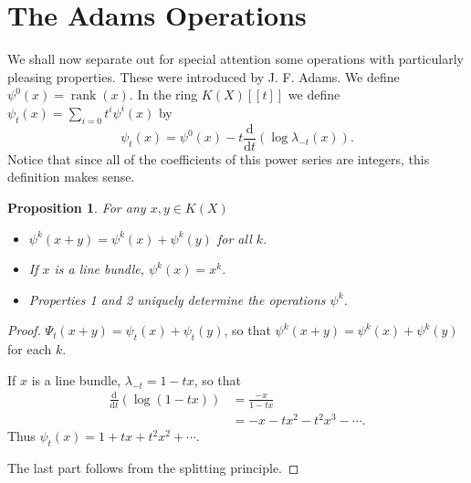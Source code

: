 \documentclass[leqno]{book}
\numberwithin{equation}{section}
\newtheorem{proposition}[theorem]{Proposition}
\theoremstyle{definition}
\begin{document}
        \section{The Adams Operations}
            We shall now separate out for special attention some operations with particularly pleasing properties. These were introduced by J. F. Adams. We define $\psi^{0}(x)=\operatorname{rank}(x)$. In the ring $K(X)[[t]]$ we define $\psi_{t}(x)=\sum_{i=0} t^{i}\psi^{i}(x)$ by 
            \begin{equation*}
              \psi_{t}(x)=\psi^{0}(x)-t \frac{\mathrm{d}}{\mathrm{d}t} (\log \lambda_{-t}(x)).
            \end{equation*}
            Notice that since all of the coefficients of this power series are integers, this definition makes sense.

            \begin{proposition}
              For any $x,y \in K(X)$
              \begin{itemize}
                \item[(1)] $\psi^{k}(x+y)=\psi^{k}(x)+\psi^{k}(y)$ for all $k$.
                \item[(2)] If $x$ is a line bundle, $\psi^{k}(x)=x^{k}$.
                \item[(3)] Properties 1 and 2 uniquely determine the operations $\psi^{k}$.
              \end{itemize}
            \end{proposition}

            \begin{proof}
              $\Psi_{t}(x+y)=\psi_{t}(x)+\psi_{t}(y)$, so that $\psi^{k}(x+y)=\psi^{k}(x)+\psi^{k}(y)$ for each $k$.

              If $x$ is a line bundle, $\lambda_{-t}=1-tx$, so that
              \begin{equation*}
                \begin{aligned}
                  \frac{\mathrm{d}}{\mathrm{d}t}(\log (1-tx)) &= \frac{-x}{1-tx} \\
                  &= -x-tx^{2}-t^{2}x^{3}- \cdots .
                \end{aligned}
              \end{equation*}
              Thus $\psi_{t}(x)=1+tx+t^{2}x^{2}+ \cdots$.

              The last part follows from the splitting principle.
            \end{proof}
\end{document}

